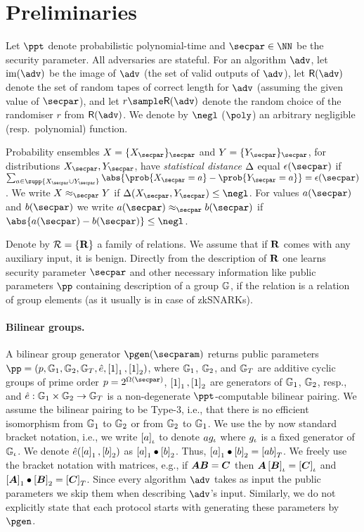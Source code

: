\let\accentvec\vec \documentclass[runningheads]{llncs}
\def\vec#1{\mathchoice{\mbox{\boldmath$\displaystyle#1$}}
{\mbox{\boldmath$\textstyle#1$}} {\mbox{\boldmath$\scriptstyle#1$}}
{\mbox{\boldmath$\scriptscriptstyle#1$}}}
\begin{document}
\section{Preliminaries}
Let $\ppt$ denote probabilistic polynomial-time and $\secpar \in \NN$ be the
security parameter.  All adversaries are stateful.  For an algorithm $\adv$,
let $\image (\adv)$ be the image of $\adv$ (the set of valid outputs of
$\adv$), let $\RND{\adv}$ denote the set of random tapes of correct length for $\adv$ (assuming the given
value of $\secpar$), and let $r \sample \RND{\adv}$ denote the random choice
of the randomiser $r$ from $\RND{\adv}$.  We denote by $\negl$ ($\poly$) an
arbitrary negligible (resp.~polynomial) function.

Probability ensembles $X = \smallset{X_\secpar}_\secpar$ and
$Y = \smallset{Y_\secpar}_\secpar$, for distributions $X_\secpar, Y_\secpar$, have \emph{statistical distance} $\Delta$ equal
$\epsilon(\secpar)$ if $\sum_{a \in \supp{X_\secpar \cup Y_\secpar}}
\abs{\prob{X_\secpar = a} - \prob{Y_\secpar = a}} = \epsilon(\secpar)$.  We
write $X \approx_\secpar Y$ if $\SD(X_\secpar, Y_\secpar) \leq \negl$.  
For values $a(\secpar)$ and $b(\secpar)$ we write $a(\secpar) \approx_\secpar
b(\secpar)$ if $\abs{a(\secpar) - b(\secpar)} \leq \negl$.  

Denote by $\mathcal{R} = \{\mathbf{R}\}$ a family of relations. We assume that if
$\mathbf{R}$ comes with any auxiliary input, it is benign. Directly from the
description of $\mathbf{R}$ one learns security parameter $\secpar$ and other
necessary information like public parameters $\pp$ containing description of a
group $\mathbb{G}$, if the relation is a relation of group elements (as it usually
is in case of zkSNARKs).

\paragraph{Bilinear groups.}
A bilinear group generator $\pgen (\secparam)$ returns public parameters $ \pp
= (p, \GRP_1, \GRP_2, \GRP_T, \pair, \gone{1}, \gtwo{1})$, where $\mathbb{G}_1$,
$\mathbb{G}_2$, and $\mathbb{G}_T$ are additive cyclic groups of prime order $p =
2^{\Omega (\secpar)}$, $\left[1\right]_{1}, \left[1\right]_{2}$ are generators of $\mathbb{G}_1$,
$\mathbb{G}_2$, resp., and $\hat{e}: \mathbb{G}_1 \times \mathbb{G}_2 \to \mathbb{G}_T$ is a
non-degenerate $\ppt$-computable bilinear pairing.  We assume the bilinear
pairing to be Type-3, i.e., that there is no efficient isomorphism from
$\mathbb{G}_1$ to $\mathbb{G}_2$ or from $\mathbb{G}_2$ to $\mathbb{G}_1$.  We use the by now standard
bracket notation, i.e., we write $\left[a\right]_{\iota}$ to denote $a g_{\iota}$ where
$g_{\iota}$ is a fixed generator of $\mathbb{G}_{\iota}$.  We denote $\hat{e} (\left[a\right]_{1},
\left[b\right]_{2})$ as $\left[a\right]_{1} \bullet \left[b\right]_{2}$.  Thus, $\left[a\right]_{1} \bullet \left[b\right]_{2} =
\left[a b\right]_{T}$.  We freely use the bracket notation with matrices, e.g., if
$\vec{A} \vec{B} = \vec{C}$ then $\vec{A} \grpgi{\vec{B}} = \grpgi{\vec{C}}$
and $\gone{\vec{A}}\bullet \gtwo{\vec{B}} = \gtar{\vec{C}}$.
Since every algorithm $\adv$ takes as input the public parameters we
skip them when describing $\adv$'s input. Similarly, we do not explicitly
state that each protocol starts with generating these parameters by $\pgen$.
\end{document}
